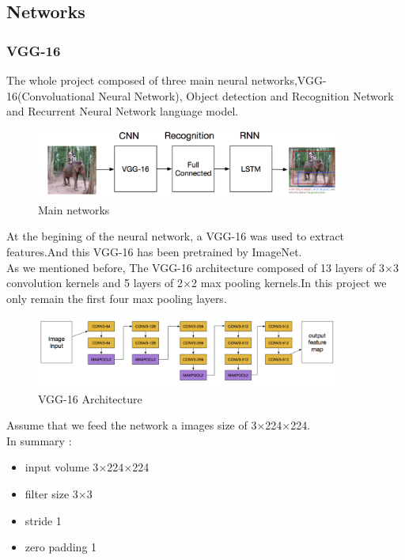 \documentclass[12pt,a4paper]{report}
\begin{document}
\subsection{Networks}
\subsubsection{VGG-16}
The whole project composed of three main neural networks,VGG-16(Convoluational Neural Network), Object detection and Recognition Network  and Recurrent Neural Network language model.

\begin{figure}[h]
\centering
\includegraphics[width=0.9\textwidth]{network.png}
\caption{Main networks}
\end{figure}
At the begining of the neural network, a VGG-16 was used to extract features.And this VGG-16 has been pretrained by ImageNet\cite{vgg}.\\
As we mentioned before, The VGG-16 architecture composed of 13 layers of  3$\times $3 convolution kernels and 5 layers of 2$\times$2 max pooling kernels.In this project we only remain the first four max pooling layers.

\begin{figure}[h]
\centering
\includegraphics[width=0.9\textwidth]{vgg162.png}
\caption{VGG-16 Architecture}
\end{figure}

Assume that we feed the network a images size of 3$\times$224$\times$224. \\
In summary :
\begin{itemize}
\item input volume 3$\times$224$\times$224
\item filter size 3$\times$3
\item stride 1
\item zero padding 1
\end{itemize}
\end{document}
